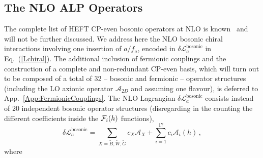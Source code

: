 \documentclass[11pt]{article}
\newcommand{\A}{\mathcal{A}}
\newcommand{\beq}{\begin{equation}}
\newcommand{\eeq}{\end{equation}}
\renewcommand{\[}{\begin{equation}}
\renewcommand{\]}{\end{equation}}
\newcommand{\LL}{\mathscr{L}}
\def\cF{{\cal F}}
\begin{document}
\vspace{0.3cm}

\subsection{The NLO ALP Operators}
  The complete list of   HEFT CP-even bosonic operators at NLO is known~\cite{Alonso:2012px,Brivio:2013pma,Brivio:2014pfa} and will not be further discussed.  We address here  the NLO bosonic chiral interactions involving one insertion of  $a/f_a$, encoded in $\delta\LL_a^\text{bosonic}$ in Eq.~(\ref{Lchiral}). The additional inclusion of fermionic 
couplings and the construction of a complete and non-redundant CP-even basis, which will turn out to be composed of a total of 32 -- bosonic and fermionic -- operator structures (including the LO axionic operator $\A_{2D}$ and assuming one flavour), 
is deferred to App.~\ref{App:FermionicCouplings}.  The NLO Lagrangian $\delta\LL_a^\text{bosonic}$ consists instead of 20 independent bosonic operator structures (disregarding in the counting the different coefficients inside the $\cF_i(h)$ functions),
\beq
\delta\LL_a^{\text{bosonic}}=\sum_{X=\tilde{B},\tilde{W},\tilde{G}}c_{X}\A_{X}+\sum_{i=1}^{17}c_i\A_i(h)\,,
\label{La_NLO}
\eeq
where
\end{document}
